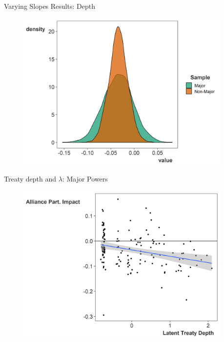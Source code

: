 \documentclass[12pt]{beamer}
\begin{document}

\begin{frame}{Varying Slopes Results: Depth}

\begin{figure}[htbp]
	\centering
		\includegraphics[width=0.95\textwidth]{var-slopes-depth.png}
\end{figure}

\end{frame}



\begin{frame}{Treaty depth and $\lambda$: Major Powers}

\begin{figure}
	\centering
		\includegraphics[width=0.95\textwidth]{ld-lambda-maj.png}
	\label{fig:ls-lambda-min}
\end{figure}


\end{frame}
\end{document}
